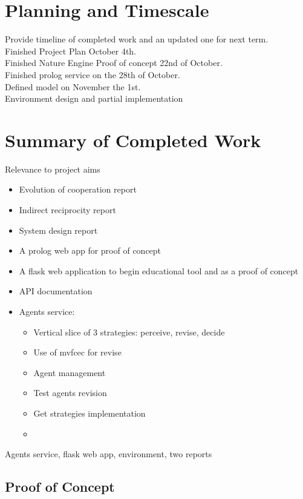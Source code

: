 \documentclass[]{final_report}
\begin{document}
\chapter{Planning and Timescale}
Provide timeline of completed work and an updated one for next term.\\
Finished Project Plan October 4th.\\
Finished Nature Engine Proof of concept 22nd of October.\\
Finished prolog service on the 28th of October.\\
Defined model on November the 1st.\\
Environment design and partial implementation\\
\begin{framed}

\end{framed}



\chapter{Summary of Completed Work}
Relevance to project aims
\begin{itemize}
	\item Evolution of cooperation report
	\item Indirect reciprocity report
	\item System design report
	\item A prolog web app for proof of concept
	\item A flask web application to begin educational tool and as a proof of concept
	\item API documentation
	\item Agents service:
	\begin{itemize}
		\item Vertical slice of 3 strategies: perceive, revise, decide
		\item Use of mvfcec for revise
		\item Agent management
		\item Test agents revision
		\item Get strategies implementation
		\item 
	\end{itemize}
\end{itemize}
Agents service, flask web app, environment, two reports

\section{Proof of Concept}
\end{document}
